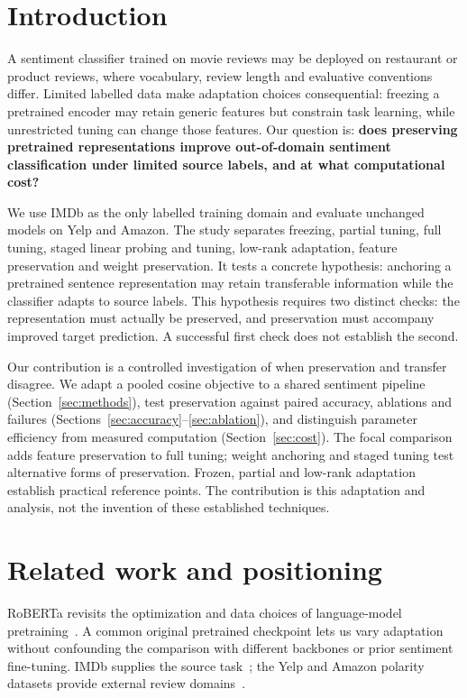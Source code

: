 \documentclass[a4paper,10pt]{article}
\begin{document}
\section{Introduction}
A sentiment classifier trained on movie reviews may be deployed on restaurant or product reviews, where vocabulary, review length and evaluative conventions differ. Limited labelled data make adaptation choices consequential: freezing a pretrained encoder may retain generic features but constrain task learning, while unrestricted tuning can change those features. Our question is: \textbf{does preserving pretrained representations improve out-of-domain sentiment classification under limited source labels, and at what computational cost?}

We use IMDb as the only labelled training domain and evaluate unchanged models on Yelp and Amazon. The study separates freezing, partial tuning, full tuning, staged linear probing and tuning, low-rank adaptation, feature preservation and weight preservation. It tests a concrete hypothesis: anchoring a pretrained sentence representation may retain transferable information while the classifier adapts to source labels. This hypothesis requires two distinct checks: the representation must actually be preserved, and preservation must accompany improved target prediction. A successful first check does not establish the second.

Our contribution is a controlled investigation of when preservation and transfer disagree. We adapt a pooled cosine objective to a shared sentiment pipeline (Section~\ref{sec:methods}), test preservation against paired accuracy, ablations and failures (Sections~\ref{sec:accuracy}--\ref{sec:ablation}), and distinguish parameter efficiency from measured computation (Section~\ref{sec:cost}). The focal comparison adds feature preservation to full tuning; weight anchoring and staged tuning test alternative forms of preservation. Frozen, partial and low-rank adaptation establish practical reference points. The contribution is this adaptation and analysis, not the invention of these established techniques.

\section{Related work and positioning}
RoBERTa revisits the optimization and data choices of language-model pretraining~\cite{roberta}. A common original pretrained checkpoint lets us vary adaptation without confounding the comparison with different backbones or prior sentiment fine-tuning. IMDb supplies the source task~\cite{imdb}; the Yelp and Amazon polarity datasets provide external review domains~\cite{reviews}.
\end{document}
